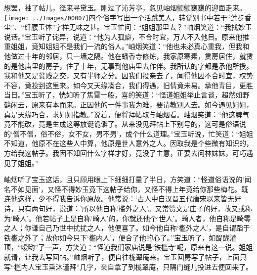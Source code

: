 想罢，袖了帖儿，径来寻黛玉。刚过了沁芳亭，忽见岫烟颤颤巍巍的迎面走来。{\texttt{[image: ../Images/00007]}四个俗字写出一个活跳美人，转觉别书中若干``莲步香尘''、``纤腰玉体''字样无味之甚。}宝玉忙问：``姐姐那里去？''岫烟笑道：``我找妙玉说话。''宝玉听了诧异，说道：``他为人孤癖，不合时宜，万人不入他目。原来他推重姐姐，竟知姐姐不是我们一流的俗人。''岫烟笑道：``他也未必真心重我，但我和他做过十年的邻居，只一墙之隔。他在蟠香寺修炼，我家原寒素，赁房居住，就赁的是他庙里的房子，住了十年，无事到他庙里去作伴。我所认的字都是承他所授。我和他又是贫贱之交，又有半师之分。因我们投亲去了，闻得他因不合时宜，权势不容，竟投到这里来。如今又天缘凑合，我们得遇，旧情竟未易。承他青目，更胜当日。''宝玉听了，恍如听了焦雷一般，喜的笑道：``怪道姐姐举止言谈，超然如野鹤闲云，原来有本而来。正因他的一件事我为难，要请教别人去。如今遇见姐姐，真是天缘巧合，求姐姐指教。''说着，便将拜帖取与岫烟看。岫烟笑道：``他这脾气竟不能改，竟是生成这等放诞诡僻了。从来没见拜帖上下别号的，这可是俗语说的`僧不僧，俗不俗，女不女，男不男'，成个什么道理。''宝玉听说，忙笑道：``姐姐不知道，他原不在这些人中算，他原是世人意外之人。因取我是个些微有知识的，方给我这帖子。我因不知回什么字样才好，竟没了主意，正要去问林妹妹，可巧遇见了姐姐。''

岫烟听了宝玉这话，且只顾用眼上下细细打量了半日，方笑道：``怪道俗语说的`闻名不如见面'，又怪不得妙玉竟下这帖子给你，又怪不得上年竟给你那些梅花。既连他这样，少不得我告诉你原故。他常说：`古人中自汉晋五代唐宋以来皆无好诗，只有两句好，说道：'所以他自称`槛外之人'。又常赞文是庄子的好，故又或称为`畸人'。他若帖子上是自称`畸人'的，你就还他个`世人'。畸人者，他自称是畸零之人；你谦自己乃世中扰扰之人，他便喜了。如今他自称`槛外之人'，是自谓蹈于铁槛之外了；故你如今只下`槛内人'，便合了他的心了。''宝玉听了，如醍醐灌顶，``嗳哟''了一声，方笑道：``怪道我们家庙说是`铁槛寺'呢，原来有这一说。姐姐就请，让我去写回帖。''岫烟听了，便自往栊翠庵来。宝玉回房写了帖子，上面只写``槛内人宝玉熏沐谨拜''几字，亲自拿了到栊翠庵，只隔门缝儿投进去便回来了。

